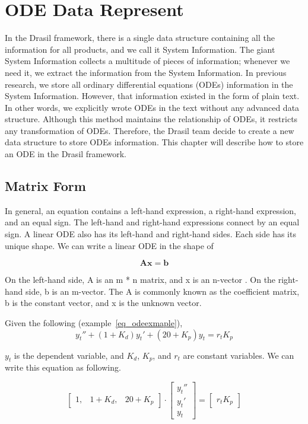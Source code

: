 \chapter{ODE Data Represent}
In the Drasil framework, there is a single data structure containing all the information for all products, and we call it System Information. The giant System Information collects a multitude of pieces of information; whenever we need it, we extract the information from the System Information. In previous research, we store all ordinary differential equations (ODEs) information in the System Information. However, that information existed in the form of plain text. In other words, we explicitly wrote ODEs in the text without any advanced data structure. Although this method maintains the relationship of ODEs, it restricts any transformation of ODEs. Therefore, the Drasil team decide to create a new data structure to store ODEs information. This chapter will describe how to store an ODE in the Drasil framework. 

\section{Matrix Form}
In general, an equation contains a left-hand expression, a right-hand expression, and an equal sign. The left-hand and right-hand expressions connect by an equal sign. A linear ODE also has its left-hand and right-hand sides. Each side has its unique shape. We can write a linear ODE in the shape of

\begin{equation} \label{eq_matrixform}
	\boldsymbol{Ax} = \boldsymbol{b}
\end{equation}

On the left-hand side, A is an m * n matrix, and x is an n-vector . On the right-hand side, b is an m-vector. The A is commonly known as the coefficient matrix, b is the constant vector, and x is the unknown vector.

Given the following (example~\ref{eq_odeexmaple}),
\begin{equation} \label{eq_odeexmaple}
	y_t'' + (1 + K_d)y_t' + (20 + K_p)y_t = r_t K_p
\end{equation}

$y_t$ is the dependent variable, and $K_d$, $K_p$, and $r_t$ are constant variables. We can write this equation as following. 

\begin{equation} \label{eq_matrixformexmaple}
	\begin{bmatrix}
		1, & 1 + K_{d}, & 20 + K_{p}
	\end{bmatrix}
	\cdot
	\begin{bmatrix}
		y_{t}''  \\
		y_{t}'   \\
		y_{t}  
	\end{bmatrix}
	=
	\begin{bmatrix}
		r_{t} K_{p} 
	\end{bmatrix}
\end{equation}

